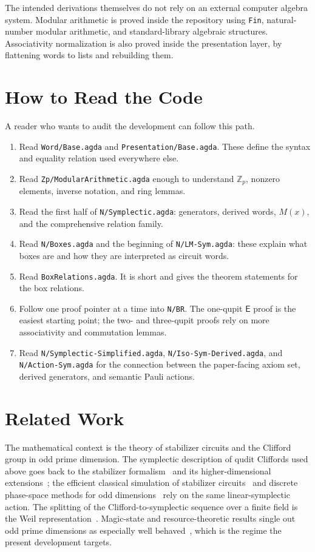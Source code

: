 \documentclass[sigplan,screen,review,anonymous]{acmart}
\newcommand{\Zp}{\mathbb{Z}_p}
\newcommand{\EBox}{\mathsf{E}}
\newcommand{\file}[1]{\texttt{#1}}
\begin{document}
The intended derivations themselves do not rely on an external
computer algebra system.  Modular arithmetic is proved inside the
repository using \texttt{Fin}, natural-number modular arithmetic, and
standard-library algebraic structures.  Associativity normalization
is also proved inside the presentation layer, by flattening words to
lists and rebuilding them.

\section{How to Read the Code}

A reader who wants to audit the development can follow this path.

\begin{enumerate}
\item Read \file{Word/Base.agda} and \file{Presentation/Base.agda}.
  These define the syntax and equality relation used everywhere else.
\item Read \file{Zp/ModularArithmetic.agda} enough to understand
  \(\Zp\), nonzero elements, inverse notation, and ring lemmas.
\item Read the first half of \file{N/Symplectic.agda}: generators,
  derived words, \(M(x)\), and the comprehensive relation family.
\item Read \file{N/Boxes.agda} and the beginning of
  \file{N/LM-Sym.agda}: these explain what boxes are and how they
  are interpreted as circuit words.
\item Read \file{BoxRelations.agda}.  It is short and gives the
  theorem statements for the box relations.
\item Follow one proof pointer at a time into \file{N/BR}.  The
  one-qupit \(\EBox\) proof is the easiest starting point; the
  two- and three-qupit proofs rely on more associativity and
  commutation lemmas.
\item Read \file{N/Symplectic-Simplified.agda},
  \file{N/Iso-Sym-Derived.agda}, and \file{N/Action-Sym.agda} for
  the connection between the paper-facing axiom set, derived
  generators, and semantic Pauli actions.
\end{enumerate}

\section{Related Work}

The mathematical context is the theory of stabilizer circuits and the
Clifford group in odd prime dimension.  The symplectic description of
qudit Cliffords used above goes back to the stabilizer
formalism~\cite{Gottesman1997,Gottesman1998} and its higher-dimensional
extensions~\cite{Gottesman1999,Hostens2005,Appleby2005,deBeaudrap2013};
the efficient classical simulation of stabilizer
circuits~\cite{Aaronson2004} and discrete phase-space methods for odd
dimensions~\cite{Gross2006} rely on the same linear-symplectic action.
The splitting of the Clifford-to-symplectic sequence over a finite field
is the Weil representation~\cite{Neuhauser2002}.  Magic-state and
resource-theoretic results single out odd prime dimensions as
especially well behaved~\cite{Veitch2014,Campbell2012,Howard2014}, which
is the regime the present development targets.
\end{document}
